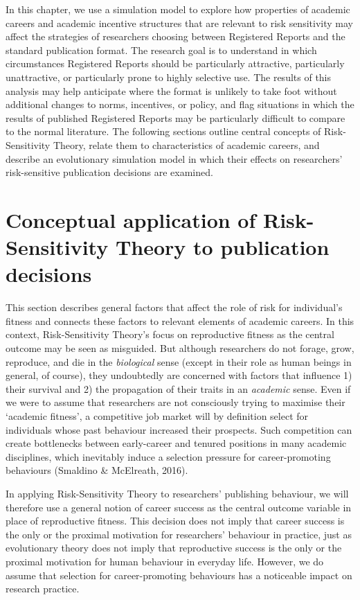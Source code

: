 \documentclass[
  ,man,mask,floatsintext]{apa6}
\begin{document}
In this chapter, we use a simulation model to explore how properties of academic careers and academic incentive structures that are relevant to risk sensitivity may affect the strategies of researchers choosing between Registered Reports and the standard publication format.
The research goal is to understand in which circumstances Registered Reports should be particularly attractive, particularly unattractive, or particularly prone to highly selective use.
The results of this analysis may help anticipate where the format is unlikely to take foot without additional changes to norms, incentives, or policy, and flag situations in which the results of published Registered Reports may be particularly difficult to compare to the normal literature.
The following sections outline central concepts of Risk-Sensitivity Theory, relate them to characteristics of academic careers, and describe an evolutionary simulation model in which their effects on researchers' risk-sensitive publication decisions are examined.

\hypertarget{conceptual-application-of-risk-sensitivity-theory-to-publication-decisions}{%
\section{Conceptual application of Risk-Sensitivity Theory to publication decisions}\label{conceptual-application-of-risk-sensitivity-theory-to-publication-decisions}}

This section describes general factors that affect the role of risk for individual's fitness and connects these factors to relevant elements of academic careers.
In this context, Risk-Sensitivity Theory's focus on reproductive fitness as the central outcome may be seen as misguided.
But although researchers do not forage, grow, reproduce, and die in the \emph{biological} sense (except in their role as human beings in general, of course), they undoubtedly are concerned with factors that influence 1) their survival and 2) the propagation of their traits in an \emph{academic} sense.
Even if we were to assume that researchers are not consciously trying to maximise their `academic fitness', a competitive job market will by definition select for individuals whose past behaviour increased their prospects.
Such competition can create bottlenecks between early-career and tenured positions in many academic disciplines, which inevitably induce a selection pressure for career-promoting behaviours (Smaldino \& McElreath, 2016).

In applying Risk-Sensitivity Theory to researchers' publishing behaviour, we will therefore use a general notion of career success as the central outcome variable in place of reproductive fitness.
This decision does not imply that career success is the only or the proximal motivation for researchers' behaviour in practice, just as evolutionary theory does not imply that reproductive success is the only or the proximal motivation for human behaviour in everyday life.
However, we do assume that selection for career-promoting behaviours has a noticeable impact on research practice.
\end{document}
